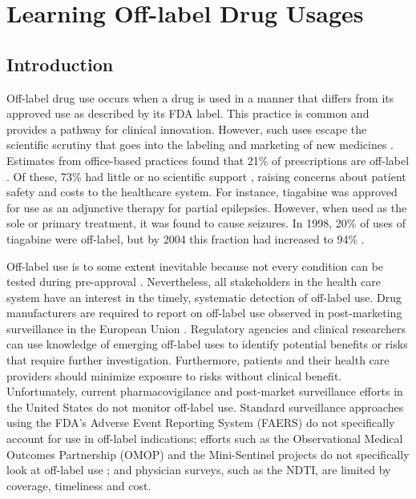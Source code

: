 \chapter{Learning Off-label Drug Usages}

\section{Introduction}
Off-label drug use occurs when a drug is used in a manner that differs
from its approved use as described by its FDA label.  This practice is
common and provides a pathway for clinical innovation.  However, such
uses escape the scientific scrutiny that goes into the labeling and
marketing of new medicines \cite{Stafford2012,Pan2012}.  Estimates
from office-based practices found that 21\% of prescriptions are
off-label .  Of these, 73\% had little or no scientific support
\cite{Radley2006,Chen2009}, raising concerns about patient safety and
costs to the healthcare system.  For instance, tiagabine was approved
for use as an adjunctive therapy for partial epilepsies.  However,
when used as the sole or primary treatment, it was found to cause
seizures.  In 1998, 20\% of uses of tiagabine were off-label, but by
2004 this fraction had increased to 94\% \cite{Flowers2006}.

Off-label use is to some extent inevitable because not every condition
can be tested during pre-approval \cite{Kimland2012,Epstein2012}.
Nevertheless, all stakeholders in the health care system have an
interest in the timely, systematic detection of off-label use.  Drug
manufacturers are required to report on off-label use observed in
post-marketing surveillance in the European Union \cite{Morris2012}.
Regulatory agencies and clinical researchers can use knowledge of
emerging off-label uses to identify potential benefits or risks that
require further investigation.  Furthermore, patients and their health
care providers should minimize exposure to risks without clinical
benefit.  Unfortunately, current pharmacovigilance and post-market
surveillance efforts in the United States do not monitor off-label
use.  Standard surveillance approaches using the FDA's Adverse Event
Reporting System (FAERS) do not specifically account for use in
off-label indications; efforts such as the Observational Medical
Outcomes Partnership (OMOP) and the Mini-Sentinel projects do not
specifically look at off-label use \cite{Platt2012}; and physician
surveys, such as the NDTI, are limited by coverage, timeliness and
cost.

